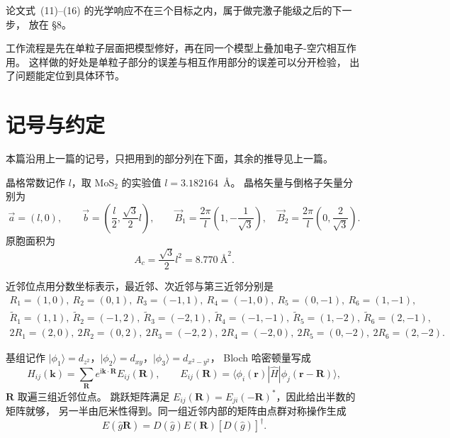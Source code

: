 \documentclass[11pt,a4paper]{ctexart}
\newcommand{\kk}{\mathbf{k}}
\newcommand{\RR}{\mathbf{R}}
\newcommand{\ii}{\mathrm{i}}
\begin{document}
论文式~(11)--(16) 的光学响应不在三个目标之内，属于做完激子能级之后的下一步，
放在 \S8。

工作流程是先在单粒子层面把模型修好，再在同一个模型上叠加电子-空穴相互作用。
这样做的好处是单粒子部分的误差与相互作用部分的误差可以分开检验，
出了问题能定位到具体环节。

\newpage
\section{记号与约定}

本篇沿用上一篇的记号，只把用到的部分列在下面，其余的推导见上一篇。

晶格常数记作 $l$，取 $\mathrm{MoS_2}$ 的实验值 $l=3.182164$~\AA{}。
晶格矢量与倒格子矢量分别为
\begin{equation}
\vec{a}=(l,0),\qquad \vec{b}=\left(\frac{l}{2},\frac{\sqrt3}{2}l\right),
\qquad
\vec{B}_1=\frac{2\pi}{l}\left(1,-\frac{1}{\sqrt3}\right),\quad
\vec{B}_2=\frac{2\pi}{l}\left(0,\frac{2}{\sqrt3}\right).
\end{equation}
原胞面积为
\begin{equation}
A_c=\frac{\sqrt3}{2}l^2=8.770\ \text{\AA}^2 .
\end{equation}

近邻位点用分数坐标表示，最近邻、次近邻与第三近邻分别是
\begin{gather}
R_1=(1,0),\ R_2=(0,1),\ R_3=(-1,1),\ R_4=(-1,0),\ R_5=(0,-1),\ R_6=(1,-1),\\
\tilde{R}_1=(1,1),\ \tilde{R}_2=(-1,2),\ \tilde{R}_3=(-2,1),\
\tilde{R}_4=(-1,-1),\ \tilde{R}_5=(1,-2),\ \tilde{R}_6=(2,-1),\\
2R_1=(2,0),\ 2R_2=(0,2),\ 2R_3=(-2,2),\
2R_4=(-2,0),\ 2R_5=(0,-2),\ 2R_6=(2,-2).
\end{gather}

基组记作 $|\phi_1\rangle=d_{z^2}$，$|\phi_2\rangle=d_{xy}$，$|\phi_3\rangle=d_{x^2-y^2}$，
Bloch 哈密顿量写成
\begin{equation}
H_{ij}(\kk)=\sum_{\RR}e^{\ii\kk\cdot\RR}E_{ij}(\RR),
\qquad
E_{ij}(\RR)=\langle\phi_i(\mathbf r)|\hat H|\phi_j(\mathbf r-\RR)\rangle ,
\label{eq:hk}
\end{equation}
$\RR$ 取遍三组近邻位点。
跳跃矩阵满足 $E_{ij}(\RR)=E_{ji}(-\RR)^*$，因此给出半数的矩阵就够，
另一半由厄米性得到。同一组近邻内部的矩阵由点群对称操作生成
\begin{equation}
E(\hat g\RR)=D(\hat g)E(\RR)\left[D(\hat g)\right]^{\dagger}.
\label{eq:sym}
\end{equation}
\end{document}
